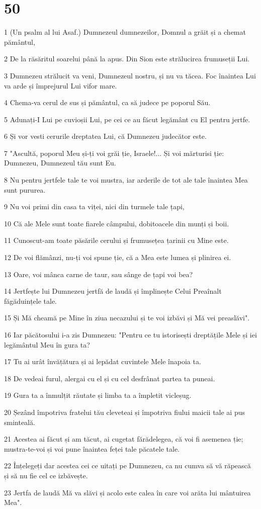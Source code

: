 \chapter{50}

\par 1 (Un psalm al lui Asaf.) Dumnezeul dumnezeilor, Domnul a grăit și a chemat pământul,
\par 2 De la răsăritul soarelui până la apus. Din Sion este strălucirea frumuseții Lui.
\par 3 Dumnezeu strălucit va veni, Dumnezeul nostru, și nu va tăcea. Foc înaintea Lui va arde și împrejurul Lui vifor mare.
\par 4 Chema-va cerul de sus și pământul, ca să judece pe poporul Său.
\par 5 Adunați-I Lui pe cuvioșii Lui, pe cei ce au făcut legământ cu El pentru jertfe.
\par 6 Și vor vesti cerurile dreptatea Lui, că Dumnezeu judecător este.
\par 7 "Ascultă, poporul Meu și-ți voi grăi ție, Israele!... Și voi mărturisi ție: Dumnezeu, Dumnezeul tău sunt Eu.
\par 8 Nu pentru jertfele tale te voi mustra, iar arderile de tot ale tale înaintea Mea sunt pururea.
\par 9 Nu voi primi din casa ta viței, nici din turmele tale țapi,
\par 10 Că ale Mele sunt toate fiarele câmpului, dobitoacele din munți și boii.
\par 11 Cunoscut-am toate păsările cerului și frumusețea țarinii cu Mine este.
\par 12 De voi flămânzi, nu-ți voi spune ție, că a Mea este lumea și plinirea ei.
\par 13 Oare, voi mânca carne de taur, sau sânge de țapi voi bea?
\par 14 Jertfește lui Dumnezeu jertfă de laudă și împlinește Celui Preaînalt făgăduințele tale.
\par 15 Și Mă cheamă pe Mine în ziua necazului și te voi izbăvi și Mă vei preaslăvi".
\par 16 Iar păcătosului i-a zis Dumnezeu: "Pentru ce tu istorisești dreptățile Mele și iei legământul Meu în gura ta?
\par 17 Tu ai urât învățătura și ai lepădat cuvintele Mele înapoia ta.
\par 18 De vedeai furul, alergai cu el și cu cel desfrânat partea ta puneai.
\par 19 Gura ta a înmulțit răutate și limba ta a împletit vicleșug.
\par 20 Șezând împotriva fratelui tău cleveteai și împotriva fiului maicii tale ai pus sminteală.
\par 21 Acestea ai făcut și am tăcut, ai cugetat fărădelegea, că voi fi asemenea ție; mustra-te-voi și voi pune înaintea feței tale păcatele tale.
\par 22 Înțelegeți dar acestea cei ce uitați pe Dumnezeu, ca nu cumva să vă răpească și să nu fie cel ce izbăvește.
\par 23 Jertfa de laudă Mă va slăvi și acolo este calea în care voi arăta lui mântuirea Mea".


